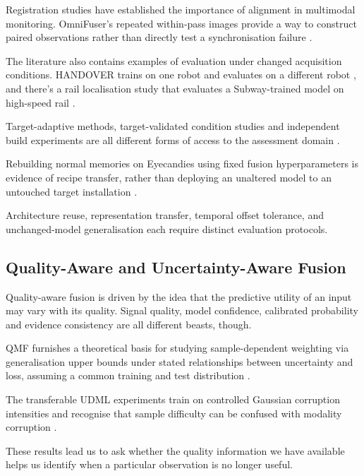 Registration studies have established the importance of alignment in multimodal monitoring.
OmniFuser's repeated within-pass images provide a way to construct paired observations rather than
directly test a synchronisation failure \parencite{petrich_multi-modal_2021,chen_multisensor_2023,wang_omnifuser_2025}.

The literature also contains examples of evaluation under changed acquisition conditions. HANDOVER
trains on one robot and evaluates on a different robot \parencite[Table~V]{thoduka_multimodal_2024}, and there's a rail localisation study that
evaluates a Subway-trained model on high-speed rail
\parencite[Table~III]{lei_dual-state-based_2025}.

Target-adaptive methods, target-validated condition studies and independent build experiments are
all different forms of access to the assessment domain
\parencite{wang_multi-source_2025,chu_novel_2024,huang_rolling_2026,bevans_heterogeneous_2023}.

Rebuilding normal memories on Eyecandies using fixed fusion hyperparameters is evidence of recipe
transfer, rather than deploying an unaltered model to an untouched target installation
\parencite{deng_tc-maf_2026,xu_cross-modal_2026}.

Architecture reuse, representation transfer, temporal offset tolerance, and unchanged-model generalisation each require distinct evaluation protocols.

\subsection{Quality-Aware and Uncertainty-Aware Fusion}

Quality-aware fusion is driven by the idea that the predictive utility of an input may vary with its
quality. Signal quality, model confidence, calibrated probability and evidence consistency are all
different beasts, though.

QMF furnishes a theoretical basis for studying sample-dependent weighting via generalisation upper
bounds under stated relationships between uncertainty and loss, assuming a common training and test
distribution \parencite[Sections~3.1--3.2]{zhang_provable_2023}.

The transferable UDML experiments train on controlled Gaussian corruption intensities and recognise
that sample difficulty can be confused with modality corruption \parencite[pp.~4--5, 9]{wei_unbiased_2026}.

These results lead us to ask whether the quality information we have available helps us identify
when a particular observation is no longer useful.

